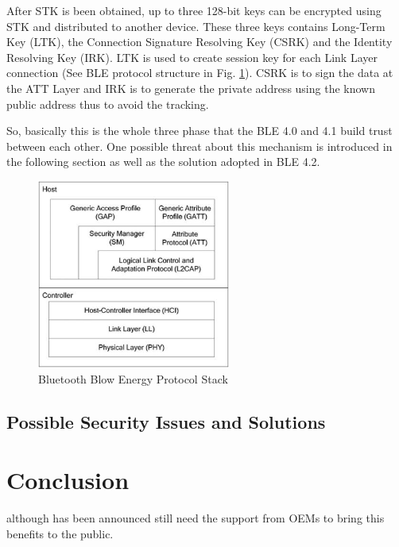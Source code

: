 \documentclass{cseminar}
\begin{document}
After STK is been obtained, up to three 128-bit keys can be encrypted using STK and distributed to another device. These three keys contains  Long-Term Key (LTK), the Connection Signature Resolving Key (CSRK) and the Identity Resolving Key (IRK). LTK is used to create session key for each Link Layer connection (See BLE protocol structure in Fig. \ref{BLE_protocol_stack}). CSRK is to sign the data at the ATT Layer and IRK is to generate the private address using the known public address thus to avoid the tracking.

So, basically this is the whole three phase that the BLE 4.0 and 4.1 build trust between each other. One possible threat about this mechanism is introduced in the following section as well as the solution adopted in BLE 4.2.
\begin{figure}
\centering
\includegraphics[width=2.5in]{figures/BLE_protocol_stack.jpg}
\caption{Bluetooth Blow Energy Protocol Stack}
\label{BLE_protocol_stack}
\end{figure}

\subsection{Possible Security Issues and Solutions}
\section{Conclusion}
although has been announced still need the support from OEMs to bring this benefits to the public.




\end{document}
